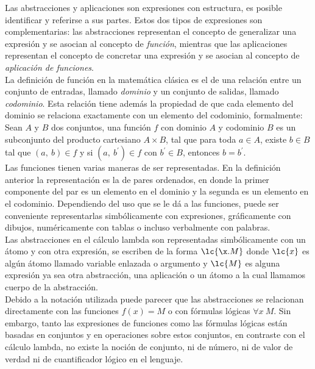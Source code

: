 Las abstracciones y aplicaciones son expresiones con estructura, es posible
identificar y referirse a sus partes. Estos dos tipos de expresiones son
complementarias: las abstracciones representan el concepto de generalizar una
expresión y se asocian al concepto de \emph{función}, mientras que las aplicaciones
representan el concepto de concretar una expresión y se asocian al concepto de
\emph{aplicación de funciones}. \\

La definición de función en la matemática clásica es el de una relación entre un
conjunto de entradas, llamado \emph{dominio} y un conjunto de salidas, llamado
\emph{codominio}. Esta relación tiene además la propiedad de que cada elemento
del dominio se relaciona exactamente con un elemento del codominio,
formalmente: \\

Sean \(A\) y \(B\) dos conjuntos, una función \(f\) con dominio \(A\) y
codominio \(B\) es un subconjunto del producto cartesiano \(A\times B\), tal que
para toda \(a\in A\), existe \(b\in B\) tal que \((a,\ b)\in f\) y si \((a,\
b^\prime)\in f\) con \(b^\prime \in B\), entonces \(b=b^\prime\). \\

Las funciones tienen varias maneras de ser representadas. En la definición
anterior la representación es la de pares ordenados, en donde la primer
componente del par es un elemento en el dominio y la segunda es un elemento en
el codominio. Dependiendo del uso que se le dá a las funciones,
puede ser conveniente representarlas simbólicamente con expresiones,
gráficamente con dibujos, numéricamente con tablas o incluso verbalmente con
palabras. \\

Las abstracciones en el cálculo lambda son representadas simbólicamente con un
átomo y con otra expresión, se escriben de la forma \(\lc{\x.M}\) donde
\(\lc{x}\) es algún átomo llamado variable enlazada o argumento y \(\lc{M}\)
es alguna expresión ya sea otra abstracción, una aplicación o un átomo a la cual
llamamos cuerpo de la abstracción. \\

Debido a la notación utilizada puede parecer que las abstracciones se relacionan
directamente con las funciones \(f(x)=M\) o con fórmulas lógicas \(\forall x\
M\). Sin embargo, tanto las expresiones de funciones como las fórmulas lógicas
están basadas en conjuntos y en operaciones sobre estos conjuntos, en contraste
con el cálculo lambda, no existe la noción de conjunto, ni de número, ni de
valor de verdad ni de cuantificador lógico en el lenguaje. \\

